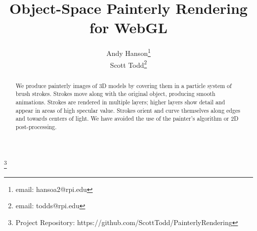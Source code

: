 \documentclass[conference]{acmsiggraph}
\title{Object-Space Painterly Rendering for WebGL}
\author{Andy Hanson\thanks{email: hansoa2@rpi.edu}\\
        Scott Todd\thanks{email: todds@rpi.edu}}
\newcommand\blfootnote[1]{%
  \begingroup
  \renewcommand\thefootnote{}\footnote{#1}%
  \addtocounter{footnote}{-1}%
  \endgroup
}
\begin{document}

\maketitle


\begin{abstract}

We produce painterly images of 3D models by covering them in a particle system
of brush strokes. Strokes move along with the original object, producing smooth
animations. Strokes are rendered in multiple layers; higher layers show detail
and appear in areas of high specular value. Strokes orient and curve themselves
along edges and towards centers of light. We have avoided the use of the
painter's algorithm or 2D post-processing.

\end{abstract}



\keywordlist


\TOGlinkslist

\blfootnote{Project Repository: https://github.com/ScottTodd/PainterlyRendering}

\copyrightspace
\end{document}
